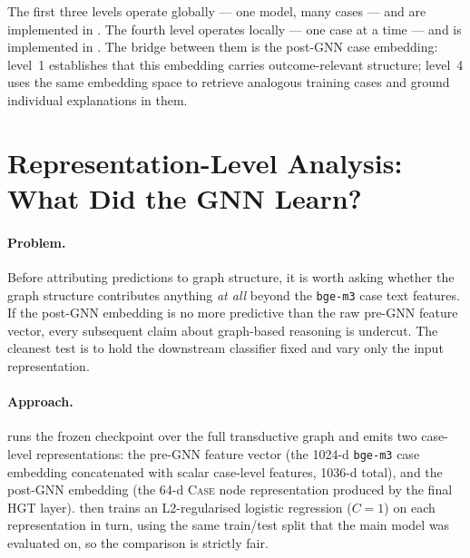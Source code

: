 The first three levels operate globally --- one model, many cases ---
and are implemented in .  The
fourth level operates locally --- one case at a time --- and is
implemented in .  The bridge between them is the
post-GNN case embedding: level~1 establishes that this embedding
carries outcome-relevant structure; level~4 uses the same embedding
space to retrieve analogous training cases and ground individual
explanations in them.

\section{Representation-Level Analysis: What Did the GNN Learn?}
\label{sec:repr_analysis}

\paragraph{Problem.}
Before attributing predictions to graph structure, it is worth asking
whether the graph structure contributes anything \emph{at all} beyond
the \texttt{bge-m3} case text features.  If the post-GNN embedding is
no more predictive than the raw pre-GNN feature vector, every
subsequent claim about graph-based reasoning is undercut.  The
cleanest test is to hold the downstream classifier fixed and vary
only the input representation.

\paragraph{Approach.}
 runs the frozen checkpoint over the full
transductive graph and emits two case-level representations: the
pre-GNN feature vector (the 1024-d \texttt{bge-m3} case embedding
concatenated with scalar case-level features, 1036-d total), and the
post-GNN embedding (the 64-d \textsc{Case} node representation
produced by the final HGT layer).   then
trains an L2-regularised logistic regression ($C\!=\!1$) on each
representation in turn, using the same train/test split that the main
model was evaluated on, so the comparison is strictly fair.

